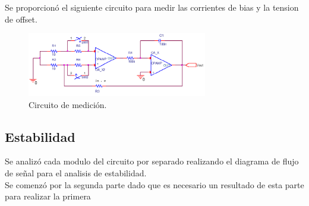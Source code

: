 Se proporcionó el siguiente circuito para medir las corrientes de bias y la tension de offset.

\begin{figure}[htb]	
	\centering
	\includegraphics[width=0.7\textwidth]{Ejercicio3/imagenes/CircMedicion.PNG}
	\caption{Circuito de medición.}
	\label{fig:CircMedicion}
\end{figure}

\subsection{Estabilidad}
Se analizó cada modulo del circuito por separado realizando el diagrama de flujo de señal para el analisis de estabilidad.\\
Se comenzó por la segunda parte dado que es necesario un resultado de esta parte para realizar la primera

